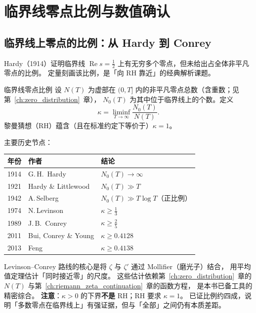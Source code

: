\section{临界线零点比例与数值确认}

\subsection{临界线上零点的比例：从 Hardy 到 Conrey}

Hardy（1914）证明临界线 $\operatorname{Re}s=\tfrac{1}{2}$ 上有无穷多个零点，但未给出占全体非平凡零点的比例。
定量刻画该比例，是「向 RH 靠近」的经典解析课题。

\begin{definition}{临界线零点比例}{}
设 $N(T)$ 为虚部在 $(0,T]$ 内的非平凡零点总数（含重数；见第~\ref{ch:zero_distribution}~章），
$N_0(T)$ 为其中位于临界线上的个数。定义
\[
  \kappa = \liminf_{T\to\infty} \frac{N_0(T)}{N(T)}.
\]
黎曼猜想（RH）蕴含（且在标准约定下等价于）$\kappa = 1$。
\end{definition}

主要历史节点：

\begin{center}
\renewcommand{\arraystretch}{1.5}
\begin{tabular}{lll}
\toprule
\textbf{年份} & \textbf{作者} & \textbf{结论} \\
\midrule
1914 & G.\,H.\ Hardy & $N_0(T)\to\infty$ \\
1921 & Hardy \& Littlewood & $N_0(T) \gg T$ \\
1942 & A.\,Selberg & $N_0(T) \gg T\log T$（正比例） \\
1974 & N.\,Levinson & $\kappa \geq \tfrac{1}{3}$ \\
1989 & J.\,B.\ Conrey & $\kappa \geq \tfrac{2}{5}$ \\
2011 & Bui, Conrey \& Young & $\kappa \geq 0.4128$ \\
2013 & Feng & $\kappa \geq 0.4138$ \\
\bottomrule
\end{tabular}
\end{center}

Levinson--Conrey 路线的核心是将 $\zeta$ 与 $\zeta'$ 通过 Mollifier（磨光子）结合，
用平均值定理估计「同时接近零」的尺度。
这些估计依赖第~\ref{ch:zero_distribution}~章的 $N(T)$ 与第~\ref{ch:riemann_zeta_continuation}~章的函数方程，
是本书已备工具的精密综合。
\textbf{注意}：$\kappa>0$ 的下界\textbf{不是} RH；RH 要求 $\kappa=1$。
已证比例约四成，说明「多数零点在临界线上」有强证据，但与「全部」之间仍有本质差距。

